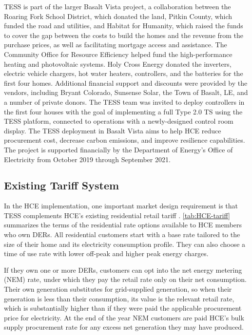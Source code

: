 TESS is part of the larger Basalt Vista project, a collaboration between the Roaring Fork School District, which donated the land, Pitkin County, which funded the road and utilities, and Habitat for Humanity, which raised the funds to cover the gap between the costs to build the homes and the revenue from the purchase prices, as well as facilitating mortgage access and assistance.  The Community Office for Resource Efficiency helped fund the high-performance heating and photovoltaic systems. Holy Cross Energy donated the inverters, electric vehicle chargers, hot water heaters, controllers, and the batteries for the first four homes.  Additional financial support and discounts were provided by the vendors, including Bryant Colorado, Sunsense Solar, the Town of Basalt, LE, and a number of private donors. The TESS team was invited to deploy controllers in the first four houses with the goal of implementing a full Type 2.0 TS using the TESS platform, connected to operations with a newly-designed control room display. The TESS deployment in Basalt Vista aims to help HCE reduce procurement cost, decrease carbon emissions, and improve resilience capabilities. The project is supported financially by the Department of Energy's Office of Electricity from October 2019 through September 2021.

\subsection{Existing Tariff System}\label{sec:HCE_tariff}

In the HCE implementation, one important market design requirement is that TESS complements HCE's existing residential retail tariff \citep{holy_cross_energy_electric_2020}.
\cref{tab:HCE-tariff} summarizes the terms of the residential rate options available to HCE members who own DERs. All residential customers start with a base rate tailored to the size of their home and its electricity consumption profile. They can also choose a time of use rate with lower off-peak and higher peak energy charges. 



If they own one or more DERs, customers can opt into the net energy metering (NEM) rate, under which they pay the retail rate only on their net consumption. Their own generation substitutes for grid-supplied generation, so when their generation is less than their consumption, its value is the relevant retail rate, which is substantially higher than if they were paid the applicable procurement price for electricity. At the end of the year NEM customers are paid HCE's bulk supply procurement rate for any excess net generation they may have produced.

